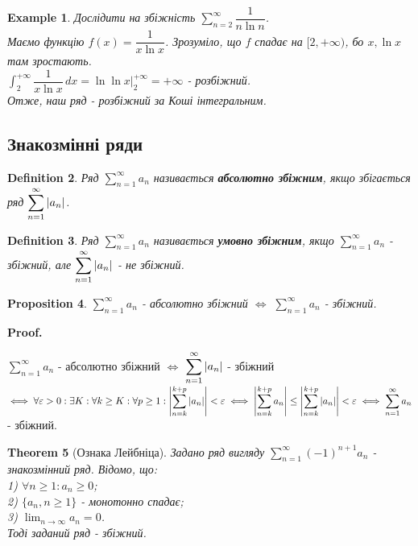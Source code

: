\documentclass[a4paper, 10pt]{article}
\makeatletter
\def\huge{\displaystyle}
\def\qed{$\blacksquare$}
\theoremstyle{theoremdd}
\newtheorem{theorem}{Theorem}[subsection]
\theoremstyle{theoremdd}
\newtheorem{definition}[theorem]{Definition}
\theoremstyle{theoremdd}
\theoremstyle{theoremdd}
\newtheorem{example}[theorem]{Example}
\theoremstyle{theoremdd}
\newtheorem{proposition}[theorem]{Proposition}
\theoremstyle{theoremdd}
\theoremstyle{theoremdd}
\theoremstyle{theoremdd}
\renewenvironment{proof}[1][Proof.\\]{\par
\pushQED{\hfill \qed}%
\normalfont \topsep6\p@\@plus6\p@\relax
\trivlist
\item\relax
{\bfseries
#1\@addpunct{.}}\hspace\labelsep\ignorespaces
}{%
\popQED\endtrivlist\@endpefalse
}
\makeatother
\begin{document}
\begin{example}
Дослідити на збіжність $\huge\sum_{n=2}^\infty \dfrac{1}{n \ln n}$.\\
Маємо функцію $f(x) = \dfrac{1}{x \ln x}$. Зрозуміло, що $f$ спадає на $[2,+\infty)$, бо $x, \ln x$ там зростають.\\
$\huge\int_2^{+\infty} \dfrac{1}{x \ln x}\,dx = \ln \ln x \Big|_2^{+\infty} = +\infty$ - розбіжний.\\
Отже, наш ряд - розбіжний за Коші інтегральним.
\end{example}

\subsection{Знакозмінні ряди}
\begin{definition}
Ряд $\huge \sum_{n=1}^\infty a_n$ називається \textbf{абсолютно збіжним}, якщо збігається ряд $\huge \sum_{n=1}^\infty \abs{a_n}$.
\end{definition}

\begin{definition}
Ряд $\huge \sum_{n=1}^\infty a_n$ називається \textbf{умовно збіжним}, якщо $\huge \sum_{n=1}^\infty a_n$ - збіжний, але $\huge \sum_{n=1}^\infty \abs{a_n}$ - не збіжний.
\end{definition}

\begin{proposition}
$\huge \sum_{n=1}^\infty a_n$ - абсолютно збіжний $\iff$ $\huge \sum_{n=1}^\infty a_n$ - збіжний.
\end{proposition}

\begin{proof}
$\huge \sum_{n=1}^\infty a_n$ - абсолютно збіжний $\iff$ $\huge \sum_{n=1}^\infty \abs{a_n}$ - збіжний $\iff \forall \varepsilon > 0: \exists K: \forall k \geq K: \forall p \geq 1: \\ \huge \abs{\sum_{n=k}^{k+p} \abs{a_n}} < \varepsilon \iff \abs{\sum_{n=k}^{k+p} a_n} \leq \abs{\sum_{n=k}^{k+p} \abs{a_n}} < \varepsilon \iff  \sum_{n=1}^\infty a_n$ - збіжний.
\end{proof}

\begin{theorem}[Ознака Лейбніца]
Задано ряд вигляду $\huge \sum_{n=1}^\infty (-1)^{n+1}a_n$ - знакозмінний ряд. Відомо, що:\\
1) $\forall n \geq 1: a_n \geq 0$;\\
2) $\{a_n, n \geq 1 \}$ - монотонно спадає;\\
3) $\huge \lim_{n \to \infty} a_n = 0$.\\
Тоді заданий ряд - збіжний.
\end{theorem}
\end{document}
